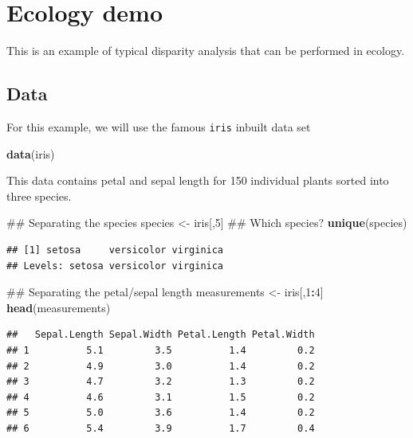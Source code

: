 \documentclass[]{book}
\newenvironment{Shaded}{\begin{snugshade}}{\end{snugshade}}
\newcommand{\KeywordTok}[1]{\textcolor[rgb]{0.13,0.29,0.53}{\textbf{#1}}}
\newcommand{\DecValTok}[1]{\textcolor[rgb]{0.00,0.00,0.81}{#1}}
\newcommand{\StringTok}[1]{\textcolor[rgb]{0.31,0.60,0.02}{#1}}
\newcommand{\OperatorTok}[1]{\textcolor[rgb]{0.81,0.36,0.00}{\textbf{#1}}}
\newcommand{\NormalTok}[1]{#1}
\theoremstyle{definition}
\theoremstyle{definition}
\theoremstyle{remark}
\begin{document}
\chapter{Ecology demo}\label{ecology-demo}

This is an example of typical disparity analysis that can be performed
in ecology.

\section{Data}\label{data}

For this example, we will use the famous \texttt{iris} inbuilt data set

\begin{Shaded}
\begin{Highlighting}[]
\KeywordTok{data}\NormalTok{(iris)}
\end{Highlighting}
\end{Shaded}

This data contains petal and sepal length for 150 individual plants
sorted into three species.

\begin{Shaded}
\begin{Highlighting}[]
\NormalTok{## Separating the species}
\NormalTok{species <-}\StringTok{ }\NormalTok{iris[,}\DecValTok{5}\NormalTok{]}
\NormalTok{## Which species?}
\KeywordTok{unique}\NormalTok{(species)}
\end{Highlighting}
\end{Shaded}

\begin{verbatim}
## [1] setosa     versicolor virginica 
## Levels: setosa versicolor virginica
\end{verbatim}

\begin{Shaded}
\begin{Highlighting}[]
\NormalTok{## Separating the petal/sepal length}
\NormalTok{measurements <-}\StringTok{ }\NormalTok{iris[,}\DecValTok{1}\OperatorTok{:}\DecValTok{4}\NormalTok{]}
\KeywordTok{head}\NormalTok{(measurements)}
\end{Highlighting}
\end{Shaded}

\begin{verbatim}
##   Sepal.Length Sepal.Width Petal.Length Petal.Width
## 1          5.1         3.5          1.4         0.2
## 2          4.9         3.0          1.4         0.2
## 3          4.7         3.2          1.3         0.2
## 4          4.6         3.1          1.5         0.2
## 5          5.0         3.6          1.4         0.2
## 6          5.4         3.9          1.7         0.4
\end{verbatim}
\end{document}
